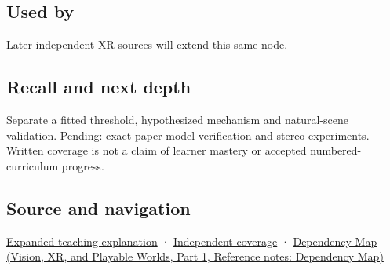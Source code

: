 \subsection{Used by}\label{appendix-8dc848f14052-used-by}

\hypertarget{appendix-8dc848f14052-used-by}{}

Later independent XR sources will extend this same node.

\subsection{Recall and next depth}\label{appendix-8dc848f14052-recall-and-next-depth}

\hypertarget{appendix-8dc848f14052-recall-and-next-depth}{}

Separate a fitted threshold, hypothesized mechanism and natural-scene validation. Pending: exact paper model verification and stereo experiments. Written coverage is not a claim of learner mastery or accepted numbered-curriculum progress.

\subsection{Source and navigation}\label{appendix-8dc848f14052-source-and-navigation}

\hypertarget{appendix-8dc848f14052-source-and-navigation}{}

\hyperref[04-visual-computing-ii-ch042-binocular-depth-changes-the-optimization-question]{Expanded teaching explanation} · \hyperref[appendix-fd090d982a15-xr01---independent-seeing-and-representation-source]{Independent coverage} · \href{../07-Vision-XR-and-Playable-Worlds-P01/main.pdf\#appendix-4ad47bdd269a}{Dependency Map (Vision, XR, and Playable Worlds, Part 1, Reference notes: Dependency Map)}
